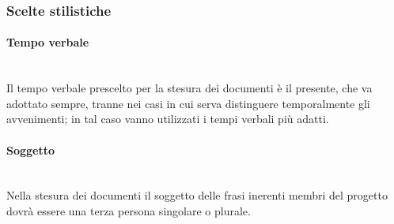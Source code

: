 \subsubsection{Scelte stilistiche}

\paragraph{Tempo verbale} \mbox{} \\
Il tempo verbale prescelto per la stesura dei documenti è il presente, che va adottato sempre, tranne nei casi in cui serva distinguere temporalmente gli avvenimenti; in tal caso vanno utilizzati i tempi verbali più adatti.

\paragraph{Soggetto} \mbox{} \\
Nella stesura dei documenti il soggetto delle frasi inerenti membri del progetto dovrà essere una terza persona singolare o plurale.

